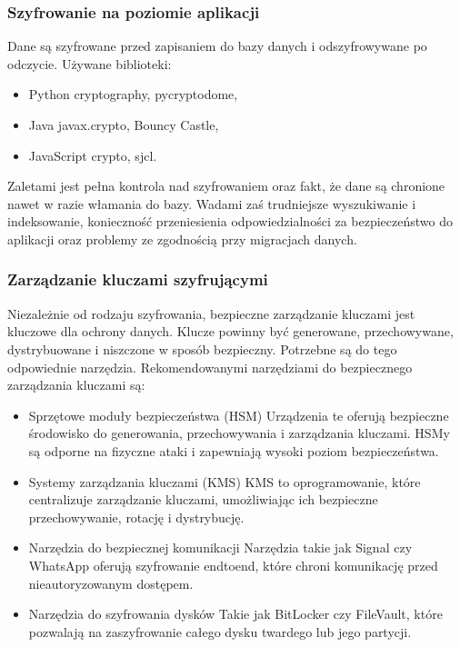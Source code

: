 \documentclass[a4paper,11pt,openany,english]{sphinxmanual}
\begin{document}
\subsubsection{Szyfrowanie na poziomie aplikacji}
\label{\detokenize{rozdzial2/Bezpieczenstwo/index:szyfrowanie-na-poziomie-aplikacji}}
\sphinxAtStartPar
Dane są szyfrowane przed zapisaniem do bazy danych i odszyfrowywane po odczycie. Używane biblioteki:
\begin{itemize}
\item {} 
\sphinxAtStartPar
Python \textendash{} cryptography, pycryptodome,

\item {} 
\sphinxAtStartPar
Java \textendash{} javax.crypto, Bouncy Castle,

\item {} 
\sphinxAtStartPar
JavaScript \textendash{} crypto, sjcl.

\end{itemize}

\sphinxAtStartPar
Zaletami jest pełna kontrola nad szyfrowaniem oraz fakt, że dane są chronione nawet w razie włamania do bazy. Wadami zaś trudniejsze wyszukiwanie i indeksowanie, konieczność przeniesienia odpowiedzialności za bezpieczeństwo do aplikacji oraz problemy ze zgodnością przy migracjach danych.


\subsubsection{Zarządzanie kluczami szyfrującymi}
\label{\detokenize{rozdzial2/Bezpieczenstwo/index:zarzadzanie-kluczami-szyfrujacymi}}
\sphinxAtStartPar
Niezależnie od rodzaju szyfrowania, bezpieczne zarządzanie kluczami jest kluczowe dla ochrony danych. Klucze powinny być generowane, przechowywane, dystrybuowane i niszczone w sposób bezpieczny. Potrzebne są do tego odpowiednie narzędzia. Rekomendowanymi narzędziami do bezpiecznego zarządzania kluczami są:
\begin{itemize}
\item {} 
\sphinxAtStartPar
Sprzętowe moduły bezpieczeństwa (HSM) \sphinxhyphen{} Urządzenia te oferują bezpieczne środowisko do generowania, przechowywania i zarządzania kluczami. HSM\sphinxhyphen{}y są odporne na fizyczne ataki i zapewniają wysoki poziom bezpieczeństwa.

\item {} 
\sphinxAtStartPar
Systemy zarządzania kluczami (KMS) \sphinxhyphen{} KMS to oprogramowanie, które centralizuje zarządzanie kluczami, umożliwiając ich bezpieczne przechowywanie, rotację i dystrybucję.

\item {} 
\sphinxAtStartPar
Narzędzia do bezpiecznej komunikacji \sphinxhyphen{} Narzędzia takie jak Signal czy WhatsApp oferują szyfrowanie end\sphinxhyphen{}to\sphinxhyphen{}end, które chroni komunikację przed nieautoryzowanym dostępem.

\item {} 
\sphinxAtStartPar
Narzędzia do szyfrowania dysków \sphinxhyphen{} Takie jak BitLocker czy FileVault, które pozwalają na zaszyfrowanie całego dysku twardego lub jego partycji.

\end{itemize}
\end{document}

